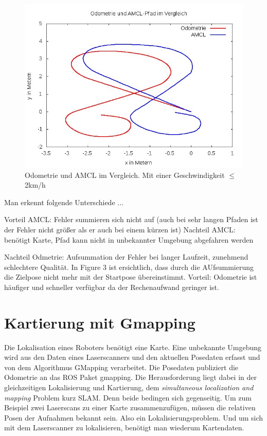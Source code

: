 \documentclass[11pt,a4paper]{article}
\begin{document}
{\begin{figure}[h]
	\includegraphics[width=\linewidth]{pictures/odo_amcl_comparision_slow.jpg}
	\caption{ Odometrie und AMCL im Vergleich. Mit einer Geschwindigkeit $\leq$ 2km/h}
\end{figure}


Man erkennt folgende Unterschiede ...

Vorteil AMCL: Fehler summieren sich nicht auf (auch bei sehr langen Pfaden ist der Fehler nicht größer als er auch bei einem kürzen ist)
Nachteil AMCL: benötigt Karte, Pfad kann nicht in unbekannter Umgebung abgefahren werden

Nachteil Odmetrie: Aufsummation der Fehler bei langer Laufzeit, zunehmend schlechtere Qualit\"at.
         In Figure 3 ist ersichtlich, dass durch die AUfsummierung die Zielpose nicht mehr mit der Startpose \"ubereinstimmt.
Vorteil: Odometrie ist häufiger und schneller verfügbar da der Rechenaufwand geringer ist. 


\section{Kartierung mit Gmapping} \cite{gmapping}
Die Lokalisation eines Roboters ben\"otigt eine Karte. Eine unbekannte Umgebung wird aus den Daten eines Laserscanners und den aktuellen Posedaten erfasst und von dem Algorithmus GMapping verarbeitet. Die Posedaten publiziert die Odometrie an das ROS Paket gmapping.
Die Herausforderung liegt dabei in der gleichzeitigen Lokalisierung und Kartierung, dem \textit{simultaneous localization and mapping} Problem kurz SLAM. Denn beide bedingen sich gegenseitig. Um zum Beispiel zwei Laserscans zu einer Karte zusammenzuf\"ugen, m\"ussen die relativen Posen der Aufnahmen bekannt sein. Also ein Lokalisierungsproblem. Und um sich mit dem Laserscanner zu lokalisieren, benötigt man wiederum Kartendaten. 



}
\end{document}
